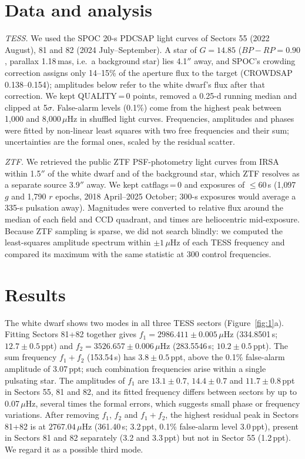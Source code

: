\documentclass[RNAAS]{aastex631}
\begin{document}
\section{Data and analysis}
\textit{TESS.} We used the SPOC 20-s PDCSAP light curves of Sectors 55 (2022 August), 81 and 82 (2024 July--September).
A star of $G=14.85$ ($BP-RP=0.90$, parallax 1.18\,mas, i.e.\ a background star) lies 4.1$''$ away, and SPOC's crowding
correction assigns only 14--15\% of the aperture flux to the target (CROWDSAP 0.138--0.154); amplitudes below refer
to the white dwarf's flux after that correction. We kept QUALITY\,=\,0 points, removed a 0.25-d running median and
clipped at 5$\sigma$. False-alarm levels (0.1\%) come from the highest peak between 1{,}000 and 8{,}000\,$\mu$Hz in
shuffled light curves. Frequencies, amplitudes and phases were fitted by non-linear least squares with two free
frequencies and their sum; uncertainties are the formal ones, scaled by the residual scatter.

\textit{ZTF.} We retrieved the public ZTF PSF-photometry light curves \citep{bellm2019,masci2019} from IRSA within
1.5$''$ of the white dwarf and of the background star, which ZTF resolves as a separate source 3.9$''$ away. We
kept catflags\,=\,0 and exposures of $\le 60$\,s (1{,}097 $g$ and 1{,}790 $r$ epochs, 2018 April--2025 October;
300-s exposures would average a 335-s pulsation away). Magnitudes were converted to relative flux around the median of
each field and CCD quadrant, and times are heliocentric mid-exposure. Because ZTF sampling is sparse, we did not
search blindly: we computed the least-squares amplitude spectrum within $\pm1\,\mu$Hz of each TESS frequency and
compared its maximum with the same statistic at 300 control frequencies.

\section{Results}
The white dwarf shows two modes in all three TESS sectors (Figure~\ref{fig:1}a). Fitting Sectors 81+82 together gives
$f_1=2986.411\pm0.005\,\mu$Hz (334.8501\,s; $12.7\pm0.5$\,ppt) and $f_2=3526.657\pm0.006\,\mu$Hz (283.5546\,s;
$10.2\pm0.5$\,ppt). The sum frequency $f_1+f_2$ (153.54\,s) has $3.8\pm0.5$\,ppt, above the 0.1\% false-alarm amplitude
of 3.07\,ppt; such combination frequencies arise within a single pulsating star. The amplitudes of $f_1$ are
$13.1\pm0.7$, $14.4\pm0.7$ and $11.7\pm0.8$\,ppt in Sectors 55, 81 and 82, and its fitted frequency differs between
sectors by up to 0.07\,$\mu$Hz, several times the formal errors, which suggests small phase or frequency variations.
After removing $f_1$, $f_2$ and $f_1+f_2$, the highest residual peak in Sectors 81+82 is at $2767.04\,\mu$Hz (361.40\,s;
3.2\,ppt, 0.1\% false-alarm level 3.0\,ppt), present in Sectors 81 and 82 separately (3.2 and 3.3\,ppt) but not in
Sector 55 (1.2\,ppt). We regard it as a possible third mode.
\end{document}
